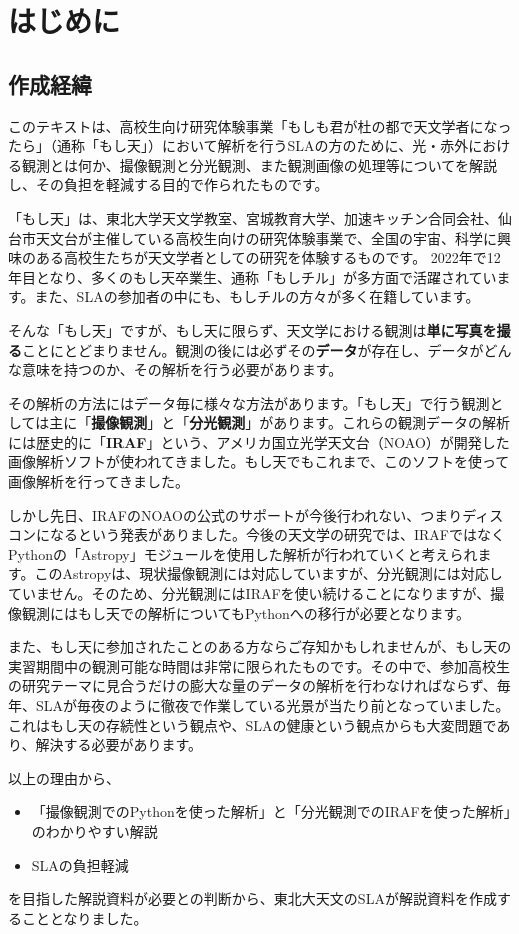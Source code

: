 \chapter{はじめに} %
\label{chap_1}
\section{作成経緯}%
\label{sec_1_1}
このテキストは、高校生向け研究体験事業「もしも君が杜の都で天文学者になったら」（通称「もし天」）において解析を行うSLAの方のために、光・赤外における観測とは何か、撮像観測と分光観測、また観測画像の処理等についてを解説し、その負担を軽減する目的で作られたものです。

「もし天」は、東北大学天文学教室、宮城教育大学、加速キッチン合同会社、仙台市天文台が主催している高校生向けの研究体験事業で、全国の宇宙、科学に興味のある高校生たちが天文学者としての研究を体験するものです\cite{moshiten}。
2022年で12年目となり、多くのもし天卒業生、通称「もしチル」が多方面で活躍されています。また、SLAの参加者の中にも、もしチルの方々が多く在籍しています。\par
そんな「もし天」ですが、もし天に限らず、天文学における観測は\textbf{単に写真を撮る}ことにとどまりません。観測の後には必ずその\textbf{データ}が存在し、データがどんな意味を持つのか、その解析を行う必要があります。\par
その解析の方法にはデータ毎に様々な方法があります。「もし天」で行う観測としては主に「\textbf{撮像観測}」と「\textbf{分光観測}」があります。これらの観測データの解析には歴史的に「\textbf{IRAF}」\cite{iraf}という、アメリカ国立光学天文台（NOAO）が開発した画像解析ソフトが使われてきました。もし天でもこれまで、このソフトを使って画像解析を行ってきました。\par
しかし先日、IRAFのNOAOの公式のサポートが今後行われない、つまりディスコンになるという発表がありました。今後の天文学の研究では、IRAFではなくPythonの「Astropy」モジュールを使用した解析が行われていくと考えられます。このAstropyは、現状撮像観測には対応していますが、分光観測には対応していません。そのため、分光観測にはIRAFを使い続けることになりますが、撮像観測にはもし天での解析についてもPythonへの移行が必要となります。\par
また、もし天に参加されたことのある方ならご存知かもしれませんが、もし天の実習期間中の観測可能な時間は非常に限られたものです。その中で、参加高校生の研究テーマに見合うだけの膨大な量のデータの解析を行わなければならず、毎年、SLAが毎夜のように徹夜で作業している光景が当たり前となっていました。これはもし天の存続性という観点や、SLAの健康という観点からも大変問題であり、解決する必要があります。\par
以上の理由から、
\begin{itemize}
    \item 「撮像観測でのPythonを使った解析」と「分光観測でのIRAFを使った解析」のわかりやすい解説
    \item SLAの負担軽減
\end{itemize}
を目指した解説資料が必要との判断から、東北大天文のSLAが解説資料を作成することとなりました。

